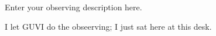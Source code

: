 %
%
\describeobservations   %

Enter your observing description here.

I let GUVI do the obseerving; I just sat here at this desk.
